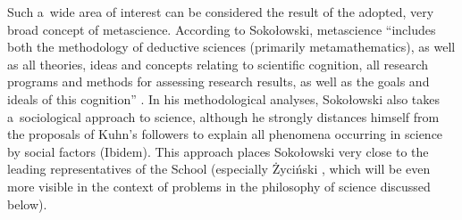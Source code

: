 \documentclass[%
  manuscript=article,
  year=2024,
  volume=77,
  doi=10.59203/zfn.77.689,
]{zfn}
\begin{document}
Such a~wide area of interest can be considered the result of the adopted, very broad concept of metascience. According to Sokołowski, metascience ``includes both the methodology of deductive sciences (primarily metamathematics), as well as all theories, ideas and concepts relating to scientific cognition, all research programs and methods for assessing research results, as well as the goals and ideals of this cognition''
\parencite[][p.57]{Sokoowski1999Maa}. %
 In his methodological analyses, Sokołowski also takes a~sociological approach to science, although he strongly distances himself from the proposals of Kuhn's followers to explain all phenomena occurring in science by social factors (Ibidem). This approach places Sokołowski very close to the leading representatives of the School (especially Życiński
\parencite[see e.g.,][]{Zycinski1993Granice}, %
 which will be even more visible in the context of problems in the philosophy of science discussed below).
\end{document}
